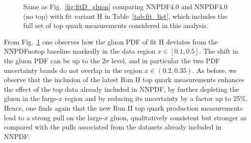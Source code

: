 \documentclass[withindex,glossary]{cam-thesis}
\begin{document}
\begin{figure}[t]
\centering
        \caption{ Same as Fig.~\ref{fig:fitD_gluon} comparing NNPDF4.0
          and NNPDF4.0 (no top) with fit variant H in Table~\ref{tab:fit_list},
          which includes the full set of top quark measurements considered in this analysis.}
\label{fig:fitH_gluon}
\end{figure}

From Fig.~\ref{fig:fitH_gluon} one observes
how the gluon PDF of fit H deviates from the NNPDFnotop baseline
markedly in the data region $x \in [0.1, 0.5]$.
%
The shift in the gluon PDF can be up to the $2\sigma$ level, and
in particular the two PDF uncertainty bands do not overlap
in the region $x\in \left( 0.2, 0.35\right) $.
%
As before, we  observe that the inclusion of
the latest Run II top quark measurements enhances the effect of the top
data already
included in NNPDF, by further depleting the gluon in the large-$x$ region
 and  by reducing its uncertainty by a factor up to 25\%.
%
 Hence, one finds again that the new Run II top quark production
 measurements lead to
 a strong pull on the large-$x$ gluon, qualitatively
 consistent but stronger as compared
 with the pulls associated from the datasets already included in NNPDF.
\end{document}
